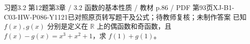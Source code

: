 \par\noindent\begin{minipage}{\linewidth}
\begin{bankitem}{习题3.2 第12题}{第3章 / 3.2 函数的基本性质 / 教材 p.86 / PDF 第93页}{XJ-B1-C03-HW-P086-Y1121}{已对照原页转写题干及公式；待教师复核；未制作答案}
已知 $f(x),g(x)$ 分别是定义在 $\mathbb R$ 上的偶函数和奇函数，且 $f(x)-g(x)=x^3+x^2+1$，求 $f(1)+g(1)$。
\end{bankitem}
\end{minipage}\par\medskip
